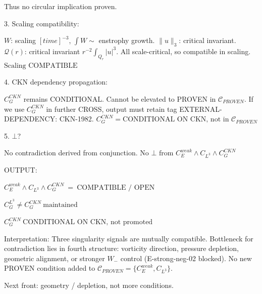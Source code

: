 \documentclass[11pt]{article}
\begin{document}
Thus no circular implication proven.

3. Scaling compatibility:

$W$: scaling $[time]^{-3}$, $\int W\sim$ enstrophy growth.
$\|u\|_3$: critical invariant.
$\mathcal{Q}(r)$: critical invariant $r^{-2}\int_{Q_r}|u|^3$.
All scale-critical, so compatible in scaling.
$\boxed{\text{Scaling COMPATIBLE}}$

4. CKN dependency propagation:

$C_G^{CKN}$ remains CONDITIONAL. Cannot be elevated to PROVEN in $\mathcal{C}_{PROVEN}$.
If we use $C_G^{CKN}$ in further CROSS, output must retain tag EXTERNAL-DEPENDENCY: CKN-1982.
$\boxed{C_G^{CKN}=\text{CONDITIONAL ON CKN, not in }\mathcal{C}_{PROVEN}}$

5. $\bot$?

No contradiction derived from conjunction.
$\boxed{\text{No }\bot\text{ from }C_E^{weak}\land C_{L^3}\land C_G^{CKN}}$

OUTPUT:

$\boxed{C_E^{weak}\land C_{L^3}\land C_G^{CKN}\ =\ \text{COMPATIBLE / OPEN}}$

$\boxed{C_G^{L^3}\neq C_G^{CKN}\ \text{maintained}}$

$\boxed{C_G^{CKN}\ \text{CONDITIONAL ON CKN, not promoted}}$

Interpretation: Three singularity signals are mutually compatible. Bottleneck for contradiction lies in fourth structure: vorticity direction, pressure depletion, geometric alignment, or stronger $W_-$ control (E-strong-neg-02 blocked). No new PROVEN condition added to $\mathcal{C}_{PROVEN}=\{C_E^{weak},C_{L^3}\}$.

Next front: geometry / depletion, not more conditions.
\end{document}
